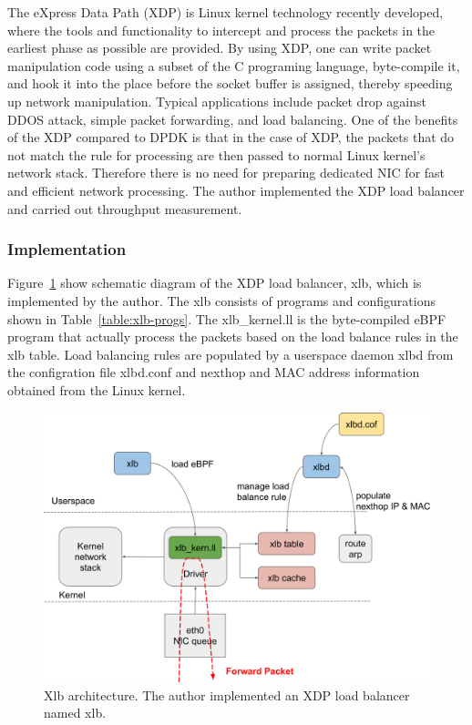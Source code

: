 The eXpress Data Path (XDP)\cite{hoiland2018express} is Linux kernel technology recently developed, where the tools and functionality to intercept and process the packets in the earliest phase as possible are provided.
By using XDP, one can write packet manipulation code using a subset of the C programing language, byte-compile it, and hook it into the place before the socket buffer is assigned, thereby speeding up network manipulation.
Typical applications include packet drop against DDOS attack, simple packet forwarding, and load balancing.
One of the benefits of the XDP compared to DPDK is that in the case of XDP, the packets that do not match the rule for processing are then passed to normal Linux kernel's network stack.
Therefore there is no need for preparing dedicated NIC for fast and efficient network processing.
The author implemented the XDP load balancer and carried out throughput measurement.

\subsubsection{Implementation}

Figure~\ref{fig:xlb-schem} show schematic diagram of the XDP load balancer, xlb, which is implemented by the author.
The xlb consists of programs and configurations shown in Table~\ref{table:xlb-progs}.
The xlb\_kernel.ll is the byte-compiled eBPF program that actually process the packets based on the load balance rules in the xlb table.
Load balancing rules are populated by a userspace daemon xlbd from the configration file xlbd.conf and nexthop and MAC address information obtained from the Linux kernel.

\begin{figure}[h]
  \centering
  \includegraphics[width=0.9\columnwidth]{Figs/xlb-schem}

  \par\bigskip
  \centering
  \begin{minipage}{0.9\columnwidth}
    \caption[Xlb architecture]{
      Xlb architecture.
      The author implemented an XDP load balancer named xlb.
    }
    \label{fig:xlb-schem}
  \end{minipage}
\end{figure}

